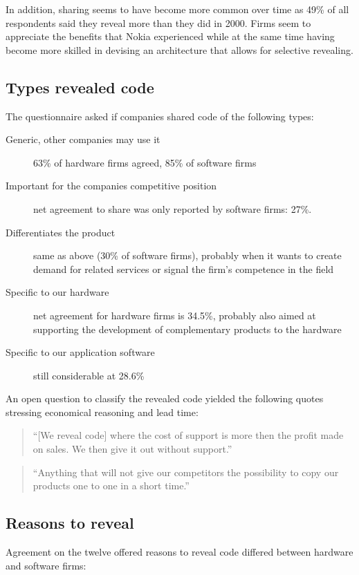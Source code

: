 \documentclass[a4paper]{scrartcl}
\begin{document}
In addition, sharing seems to have become more common over time as 49\% of all respondents said they reveal more than they did in 2000.
Firms seem to appreciate the benefits that Nokia experienced while at the same time having become more skilled in devising an architecture that allows for selective revealing.

\subsection{Types revealed code}

The questionnaire asked if companies shared code of the following types: 
\begin{description}
\item[Generic, other companies may use it] 63\% of hardware firms agreed, 85\% of software firms
\item[Important for the companies competitive position] net agreement to share was only reported by software firms: 27\%.
\item[Differentiates the product] same as above (30\% of software firms), probably when it wants to create demand for related services or signal the firm's competence in the field
\item[Specific to our hardware] net agreement for hardware firms is 34.5\%, probably also aimed at supporting the development of complementary products to the hardware 
\item[Specific to our application software] still considerable at 28.6\%
\end{description}

An open question to classify the revealed code yielded the following quotes stressing economical reasoning and lead time:
\begin{quote}
``[We reveal code] where the cost of support is more then the profit made on sales. We then give it out without support.''
\end{quote}
\begin{quote}
``Anything that will not give our competitors the possibility to copy our products one to one in a short time.''
\end{quote}

\subsection{Reasons to reveal}

Agreement on the twelve offered reasons to reveal code differed between hardware and software firms:
\end{document}
